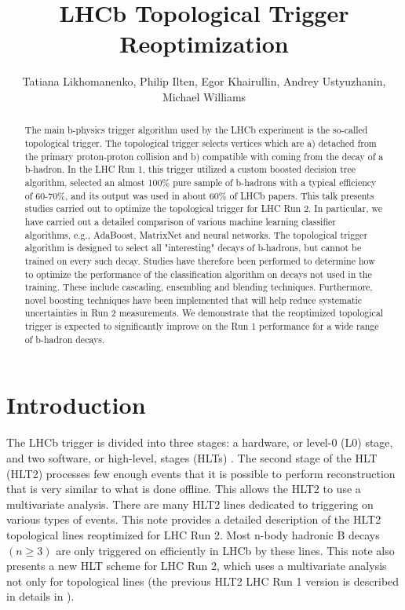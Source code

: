 \documentclass[a4paper]{jpconf}
\begin{document}
\title{LHCb Topological Trigger Reoptimization}

\author{Tatiana Likhomanenko, Philip Ilten, Egor Khairullin, Andrey Ustyuzhanin, Michael Williams}





\begin{abstract}
The main b-physics trigger algorithm used by the LHCb experiment is the so-called topological trigger. The topological trigger selects vertices which are a) detached from the primary proton-proton collision and b) compatible with coming from the decay of a b-hadron. In the LHC Run 1, this trigger utilized a custom boosted decision tree algorithm, selected an almost 100\% pure sample of b-hadrons with a typical efficiency of 60-70\%, and its output was used in about 60\% of LHCb papers. This talk presents studies carried out to optimize the topological trigger for LHC Run 2. In particular, we have carried out a detailed comparison of various machine learning classifier algorithms, e.g., AdaBoost, MatrixNet and neural networks. The topological trigger algorithm is designed to select all "interesting" decays of b-hadrons, but cannot be trained on every such decay. Studies have therefore been performed to determine how to optimize the performance of the classification algorithm on decays not used in the training. These include cascading, ensembling and blending techniques. Furthermore, novel boosting techniques have been implemented that will help reduce systematic uncertainties in Run 2 measurements. We demonstrate that the reoptimized topological trigger is expected to significantly improve on the Run 1 performance for a wide range of b-hadron decays.\end{abstract}


\section{Introduction}
The LHCb trigger is divided into three stages: a hardware, or level-0 (L0) stage, and two software, or high-level, stages (HLTs) \cite{trigger_system}. The second stage of the HLT (HLT2) processes few enough events that it is possible to perform reconstruction that is very similar to what is done offline. This allows the HLT2 to use a multivariate analysis. There are many HLT2 lines dedicated to triggering on various types of events. This note provides a detailed description of the HLT2 topological lines reoptimized for LHC Run 2. Most n-body hadronic B decays $(n \geq 3)$ are only triggered on efficiently in LHCb by these lines. This note also presents a new HLT scheme for LHC Run 2, which uses a multivariate analysis not only for topological lines (the previous HLT2 LHC Run 1 version is described in details in \cite{topo1}).
\end{document}
